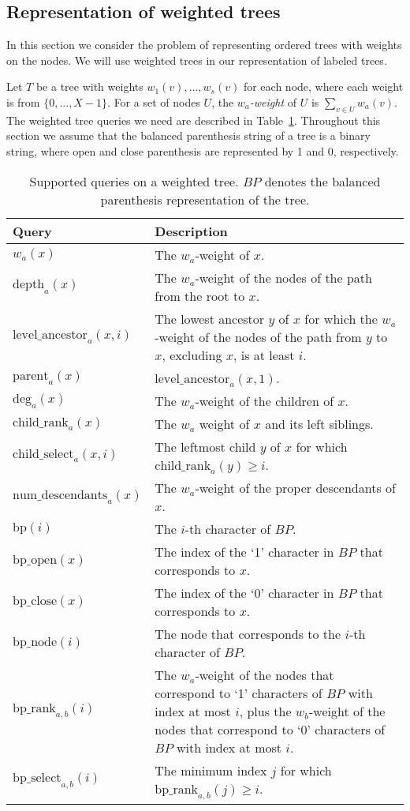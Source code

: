 \documentclass[12pt]{article}
\newcommand{\BP}{\mathit{BP}}
\newcommand{\depthb}{\mathrm{depth}}
\newcommand{\parentb}{\mathrm{parent}}
\newcommand{\levelancestorb}{\mathrm{level\_ancestor}}
\newcommand{\Degb}{\mathrm{deg}}
\newcommand{\childrankb}{\mathrm{child\_rank}}
\newcommand{\childselectb}{\mathrm{child\_select}}
\newcommand{\numdescendantsb}{\mathrm{num\_descendants}}
\newcommand{\bprankb}{\mathrm{bp\_rank}}
\newcommand{\bpselectb}{\mathrm{bp\_select}}
\newcommand{\bpopenb}{\mathrm{bp\_open}}
\newcommand{\bpcloseb}{\mathrm{bp\_close}}
\newcommand{\bpnodeb}{\mathrm{bp\_node}}
\newcommand{\depth}[2]{\depthb_{#1}(#2)}
\newcommand{\parent}[2]{\parentb_{#1}(#2)}
\newcommand{\levelancestor}[3]{\levelancestorb_{#1}(#2,#3)}
\newcommand{\Deg}[2]{\Degb_{#1}(#2)}
\newcommand{\childrank}[2]{\childrankb_{#1}(#2)}
\newcommand{\childselect}[3]{\childselectb_{#1}(#2,#3)}
\newcommand{\numdescendants}[2]{\numdescendantsb_{#1}(#2)}
\newcommand{\bp}[1]{\mathrm{bp}(#1)}
\newcommand{\bprank}[2]{\bprankb_{#1}(#2)}
\newcommand{\bpselect}[2]{\bpselectb_{#1}(#2)}
\newcommand{\bpopen}[1]{\bpopenb(#1)}
\newcommand{\bpclose}[1]{\bpcloseb(#1)}
\newcommand{\bpnode}[1]{\bpnodeb(#1)}
\newcommand{\range}[2]{\{#1,\ldots,#2\}}
\begin{document}
\subsection{Representation of weighted trees}
In this section we consider the problem of representing ordered trees with
weights on the nodes. We will use weighted trees in our representation of
labeled trees.

Let $T$ be a tree with weights $w_1(v),\ldots, w_s(v)$ for each node,
where each weight is from $\range{0}{X-1}$.
For a set of nodes $U$, the \emph{$w_a$-weight} of $U$ is
$\sum_{v\in U} w_a(v)$.
The weighted tree queries we need are described in
Table~\ref{tab:weight-queries}. Throughout this section we assume that the balanced
parenthesis string of a tree is a binary string, where open and close parenthesis are
represented by 1 and 0, respectively.

\begin{table}
\caption{Supported queries on a weighted tree.
$\BP$ denotes the balanced parenthesis representation of the tree.
\label{tab:weight-queries}}
\centering
\begin{tabular}{lp{11.4cm}}
\toprule
Query & Description \\
\midrule
$w_a(x)$ & The $w_a$-weight of $x$. \\
$\depth{a}{x}$ & The $w_a$-weight of the nodes of the path from the root
			to $x$. \\
$\levelancestor{a}{x}{i}$ & The lowest ancestor $y$ of $x$ for which
			the $w_a$-weight of the nodes of the path from $y$ to $x$,
			excluding $x$, is at least $i$.\\
$\parent{a}{x}$ &  $\levelancestor{a}{x}{1}$.\\
$\Deg{a}{x}$ & The $w_a$-weight of the children of $x$. \\
$\childrank{a}{x}$ & The $w_a$ weight of $x$ and its left siblings. \\
$\childselect{a}{x}{i}$ & The leftmost child $y$ of $x$ for which
			$\childrank{a}{y} \geq i$. \\
$\numdescendants{a}{x}$ & The $w_a$-weight of the proper descendants of $x$. \\
$\bp{i}$ & The $i$-th character of $\BP$. \\
$\bpopen{x}$ & The index of the `1' character in $\BP$ that corresponds
			to $x$. \\
$\bpclose{x}$ & The index of the `0' character in $\BP$ that corresponds
			to $x$. \\
$\bpnode{i}$ & The node that corresponds to the $i$-th character of $\BP$. \\
$\bprank{a,b}{i}$ & The $w_a$-weight of the nodes that correspond
			to `1' characters of $\BP$ with index at most $i$,
			plus the $w_b$-weight of the nodes that correspond
			to `0' characters of $\BP$ with index at most $i$. \\
$\bpselect{a,b}{i}$ & The minimum index $j$ for which 
			$\bprank{a,b}{j} \geq i$. \\
\bottomrule
\end{tabular}
\end{table}
\end{document}
